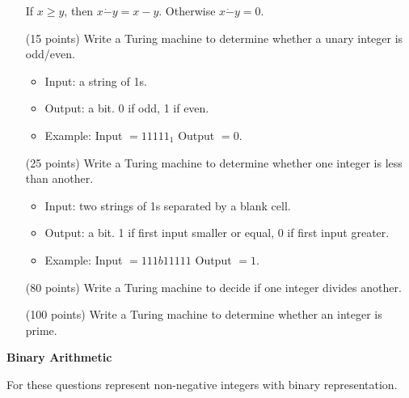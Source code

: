 \documentclass[11pt]{report}
\begin{document}
\begin{enumerate}
			If $x \geq y$, then $x \dot - y = x - y$. Otherwise $x \dot - y = 0$. 
		
		\item[(15 points)] Write a Turing machine to determine whether a unary integer is odd/even.

			\begin{itemize}
				\item Input: a string of 1s.
				\item Output: a bit. 0 if odd, 1 if even.
				\item Example: Input $= 11111_{1}$ Output $= 0$.
			\end{itemize}
		
		\item[(25 points)] Write a Turing machine to determine whether one integer is less than another.

			\begin{itemize}
				\item Input: two strings of 1s separated by a blank cell.
				\item Output: a bit. 1 if first input smaller or equal, 0 if first input greater.
				\item Example: Input $= 111b11111$ Output $= 1$.
			\end{itemize}

		\item[(80 points)] Write a Turing machine to decide if one integer divides another.
		\item[(100 points)] Write a Turing machine to determine whether an integer is prime.			

	\end{enumerate}

	\newpage
	\begin{center}
		{\bf Binary Arithmetic}
	\end{center}

	For these questions represent non-negative integers with binary representation.
\end{document}
